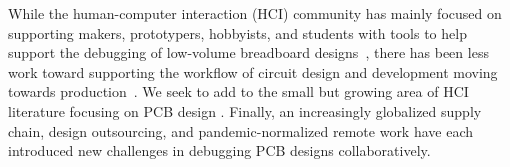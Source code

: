 \documentclass [11pt, proquest] {uwthesis}[2020/02/24]
\begin{document}


While the human-computer interaction (HCI) community has mainly focused on supporting makers, prototypers, hobbyists, and students with tools to help support the debugging of low-volume breadboard designs~\cite{Wu2017CurrentViz:Circuits, Strasnick2017Scanalog:Hardware, Kim2019VirtualComponent, Karchemsky2019Heimdall:Projects}, there has been less work toward supporting the workflow of circuit design and development moving towards production~\cite{Khurana2020BeyondProduction}.
We seek to add to the small but growing area of HCI literature focusing on PCB design \cite{Strasnick2019Pinpoint, Goyal2013BoardLab, Lin2019BeyondTools}.
Finally, an increasingly globalized supply chain, design outsourcing, and pandemic-normalized remote work have each introduced new challenges in debugging PCB designs collaboratively. 
\end{document}
